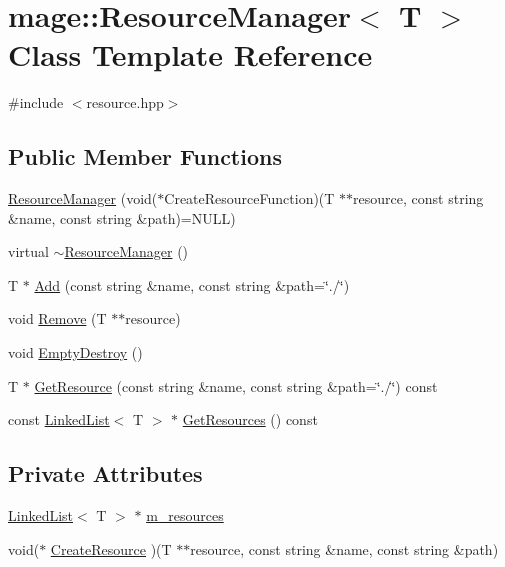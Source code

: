 \hypertarget{classmage_1_1_resource_manager}{}\section{mage\+:\+:Resource\+Manager$<$ T $>$ Class Template Reference}
\label{classmage_1_1_resource_manager}


{\ttfamily \#include $<$resource.\+hpp$>$}

\subsection*{Public Member Functions}
\begin{DoxyCompactItemize}
\item 
\hyperlink{classmage_1_1_resource_manager_aad8d61f96551b9ddd59593ed52eac241}{Resource\+Manager} (void($\ast$Create\+Resource\+Function)(T $\ast$$\ast$resource, const string \&name, const string \&path)=N\+U\+LL)
\item 
virtual \hyperlink{classmage_1_1_resource_manager_af3b6bf56e57bd3df0eb569510dd1483b}{$\sim$\+Resource\+Manager} ()
\item 
T $\ast$ \hyperlink{classmage_1_1_resource_manager_a874e36ac94e4c2063833a5f858a79a04}{Add} (const string \&name, const string \&path=\char`\"{}./\char`\"{})
\item 
void \hyperlink{classmage_1_1_resource_manager_a9fdc16b5f1627d0684c5a7e870290461}{Remove} (T $\ast$$\ast$resource)
\item 
void \hyperlink{classmage_1_1_resource_manager_a4d2dbdff0c68b3a3eb8c847848546141}{Empty\+Destroy} ()
\item 
T $\ast$ \hyperlink{classmage_1_1_resource_manager_ad22e0920555c376752b8448a81df59c6}{Get\+Resource} (const string \&name, const string \&path=\char`\"{}./\char`\"{}) const
\item 
const \hyperlink{classmage_1_1_linked_list}{Linked\+List}$<$ T $>$ $\ast$ \hyperlink{classmage_1_1_resource_manager_a33c327ebcff3a851892b7efc26bea295}{Get\+Resources} () const
\end{DoxyCompactItemize}
\subsection*{Private Attributes}
\begin{DoxyCompactItemize}
\item 
\hyperlink{classmage_1_1_linked_list}{Linked\+List}$<$ T $>$ $\ast$ \hyperlink{classmage_1_1_resource_manager_a77b6bacdb28330b1587c7d18585fdea5}{m\+\_\+resources}
\item 
void($\ast$ \hyperlink{classmage_1_1_resource_manager_a1175cdd82a5407dd099b53a432ca9a95}{Create\+Resource} )(T $\ast$$\ast$resource, const string \&name, const string \&path)
\end{DoxyCompactItemize}


